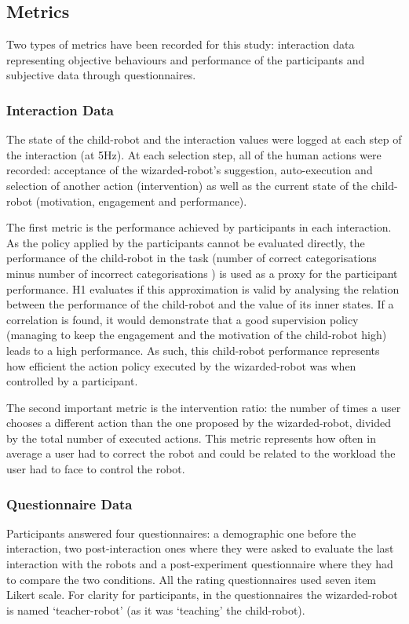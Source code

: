 \subsection{Metrics}

Two types of metrics have been recorded for this study: interaction data representing objective behaviours and performance of the participants and subjective data through questionnaires.

\subsubsection{Interaction Data}

The state of the child-robot and the interaction values were logged at each step of the interaction (at 5Hz). At each selection step, all of the human actions were recorded: acceptance of the wizarded-robot's suggestion, auto-execution and selection of another action (intervention) as well as the current state of the child-robot (motivation, engagement and performance). 

The first metric is the performance achieved by participants in each interaction. As the policy applied by the participants cannot be evaluated directly, the performance of the child-robot in the task (number of correct categorisations minus number of incorrect categorisations ) is used as a proxy for the participant performance. H1 evaluates if this approximation is valid by analysing the relation between the performance of the child-robot and the value of its inner states. If a correlation is found, it would demonstrate that a good supervision policy (managing to keep the engagement and the motivation of the child-robot high) leads to a high performance. As such, this child-robot performance represents how efficient the action policy executed by the wizarded-robot was when controlled by a participant.

The second important metric is the intervention ratio: the number of times a user chooses a different action than the one proposed by the wizarded-robot, divided by the total number of executed actions. This metric represents how often in average a user had to correct the robot and could be related to the workload the user had to face to control the robot.

\subsubsection{Questionnaire Data}
 
Participants answered four questionnaires: a demographic one before the interaction, two post-interaction ones where they were asked to evaluate the last interaction with the robots and a post-experiment questionnaire where they had to compare the two conditions. All the rating questionnaires used seven item Likert scale. For clarity for participants, in the questionnaires the wizarded-robot is named `teacher-robot' (as it was `teaching' the child-robot).

